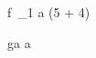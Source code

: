 
%

\begin{eqcode}{f}{\  }{_1}{}
  a  \cdot (5 + 4) \lend
\end{eqcode}

\begin{eqcode}{g}{a}{}{}
  a  \lend
\end{eqcode}


%
